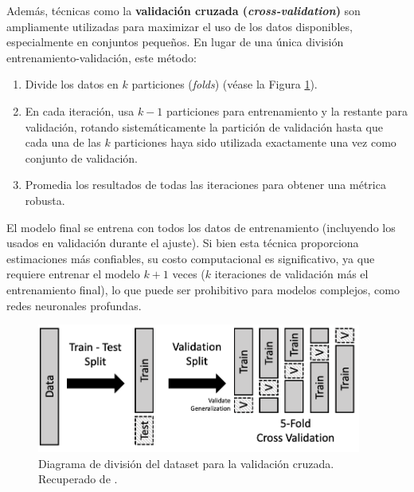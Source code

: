 Además, técnicas como la \textbf{validación cruzada (\textit{cross-validation})} son ampliamente utilizadas 
para maximizar el uso de los datos disponibles, especialmente en conjuntos pequeños. En lugar de una única 
división entrenamiento-validación, este método:

\begin{enumerate}
    \item Divide los datos en $k$ particiones (\textit{folds}) (véase la Figura \ref{fig:CVDiagram}).
    \item En cada iteración, usa $k-1$ particiones para entrenamiento y la restante para validación, rotando
    sistemáticamente la partición de validación hasta que cada una de las $k$ particiones haya sido utilizada 
    exactamente una vez como conjunto de validación. 
    \item Promedia los resultados de todas las iteraciones para obtener una métrica robusta.
\end{enumerate}

El modelo final se entrena con todos los datos de entrenamiento (incluyendo los usados en validación durante 
el ajuste). Si bien esta técnica proporciona estimaciones más confiables, su costo computacional es 
significativo, ya que requiere entrenar el modelo $k+1$ veces ($k$ iteraciones de validación más el 
entrenamiento final), lo que puede ser prohibitivo para modelos complejos, como redes neuronales profundas.

\begin{figure}[h]
    \centering
    \includegraphics[width=0.95\textwidth]{capitulos/cap_02/imagenes/CVDiagram.png}
    \caption{
        Diagrama de división del dataset para la validación cruzada. 
        Recuperado de \cite{lau2023crossvalidation}.
    } 
    \label{fig:CVDiagram}
\end{figure}




